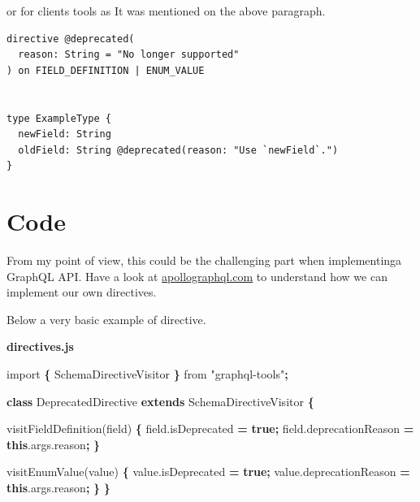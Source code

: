 \documentclass[]{book}
\newenvironment{Shaded}{\begin{snugshade}}{\end{snugshade}}
\newcommand{\KeywordTok}[1]{\textcolor[rgb]{0.13,0.29,0.53}{\textbf{#1}}}
\newcommand{\StringTok}[1]{\textcolor[rgb]{0.31,0.60,0.02}{#1}}
\newcommand{\ImportTok}[1]{#1}
\newcommand{\VariableTok}[1]{\textcolor[rgb]{0.00,0.00,0.00}{#1}}
\newcommand{\OperatorTok}[1]{\textcolor[rgb]{0.81,0.36,0.00}{\textbf{#1}}}
\newcommand{\AttributeTok}[1]{\textcolor[rgb]{0.77,0.63,0.00}{#1}}
\newcommand{\NormalTok}[1]{#1}
\begin{document}
or for clients tools as It was mentioned on the above paragraph.

\begin{verbatim}
directive @deprecated(
  reason: String = "No longer supported"
) on FIELD_DEFINITION | ENUM_VALUE


type ExampleType {
  newField: String
  oldField: String @deprecated(reason: "Use `newField`.")
}
\end{verbatim}

\section{Code}\label{code-3}

From my point of view, this could be the challenging part when
implementinga GraphQL API. Have a look at
\href{https://www.apollographql.com/docs/graphql-tools/schema-directives.html}{apollographql.com}
to understand how we can implement our own directives.

Below a very basic example of directive.

\textbf{directives.js}

\begin{Shaded}
\begin{Highlighting}[]
\ImportTok{import} \OperatorTok{\{}\NormalTok{ SchemaDirectiveVisitor }\OperatorTok{\}} \ImportTok{from} \StringTok{"graphql-tools"}\OperatorTok{;}

\KeywordTok{class}\NormalTok{ DeprecatedDirective }\KeywordTok{extends}\NormalTok{ SchemaDirectiveVisitor }\OperatorTok{\{}
  
  \AttributeTok{visitFieldDefinition}\NormalTok{(field) }\OperatorTok{\{}
    \VariableTok{field}\NormalTok{.}\AttributeTok{isDeprecated} \OperatorTok{=} \KeywordTok{true}\OperatorTok{;}
    \VariableTok{field}\NormalTok{.}\AttributeTok{deprecationReason} \OperatorTok{=} \KeywordTok{this}\NormalTok{.}\VariableTok{args}\NormalTok{.}\AttributeTok{reason}\OperatorTok{;}
  \OperatorTok{\}}

  \AttributeTok{visitEnumValue}\NormalTok{(value) }\OperatorTok{\{}
    \VariableTok{value}\NormalTok{.}\AttributeTok{isDeprecated} \OperatorTok{=} \KeywordTok{true}\OperatorTok{;}
    \VariableTok{value}\NormalTok{.}\AttributeTok{deprecationReason} \OperatorTok{=} \KeywordTok{this}\NormalTok{.}\VariableTok{args}\NormalTok{.}\AttributeTok{reason}\OperatorTok{;}
  \OperatorTok{\}}
\OperatorTok{\}}
\end{Highlighting}
\end{Shaded}
\end{document}
